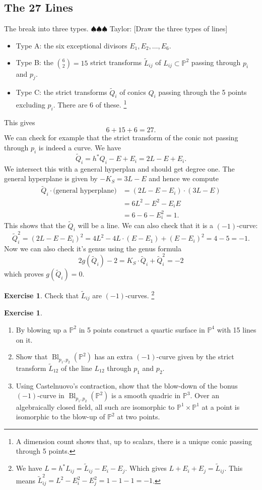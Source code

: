 \documentclass[12pt]{article}
\numberwithin{equation}{section}
\theoremstyle{definition}
\newtheorem{exercise}[theorem]{Exercise}
\theoremstyle{remark}
\newcommand{\PP}{\mathbb{P}}
\newcommand{\Bl}{\operatorname{Bl}}
\newcommand{\taylor}[1]{{\color{blue} \sf $\spadesuit\spadesuit\spadesuit$ Taylor: [#1]}}
\begin{document}
\subsection{The 27 Lines}
The break into three types.  \taylor{Draw the three types of lines}
\begin{itemize}
	\item Type A: the six exceptional divisors $E_1,E_2,\ldots,E_6$.
	\item Type B: the ${6 \choose 2}=15$ strict transforms $\widetilde{L}_{ij}$ of $L_{ij} \subset \PP^2$ passing through $p_i$ and $p_j$.
	\item Type C: the strict transforms $\widetilde{Q}_i$ of conics $Q_i$ passing through the 5 points excluding $p_i$. There are 6 of these. \footnote{A dimension count shows that, up to scalars, there is a unique conic passing through 5 points.}
\end{itemize}

This gives 
$$ 6 + 15 + 6 = 27.$$
We can check for example that the strict transform of the conic not passing through $p_i$ is indeed a curve. 
We have 
$$ \widetilde{Q}_i = h^*Q_i - E + E_i = 2L-E+E_i. $$
We intersect this with a general hyperplan and should get degree one. 
The general hyperplane is given by $ -K_S=3L - E$
and hence we compute 
\begin{align*}
\widetilde{Q}_i \cdot \mbox{(general hyperplane)} &= (2L-E-E_i)\cdot (3L-E) \\
&=6L^2-E^2-E_iE\\
&=6-6-E_i^2=1.
\end{align*}
This shows that the $\widetilde{Q}_i$ will be a line. 
We can also check that it is a $(-1)$-curve:
$$\widetilde{Q}_i^2 = (2L-E-E_i)^2 = 4L^2-4L\cdot (E-E_1) + (E-E_i)^2=4-5=-1.$$
Now we can also check it's genus using the genus formula
$$ 2g(\widetilde{Q}_i) -2 = K_S\cdot \widetilde{Q}_i +\widetilde{Q}_i^2 = -2$$
which proves $g(\widetilde{Q}_i)=0$.

\begin{exercise}
	Check that $\widetilde{L}_{ij}$ are $(-1)$-curves.
	\footnote{We have $L=h^*L_{ij} = \widetilde{L}_{ij}-E_i-E_j$.
		Which gives $L+E_i+E_j = \widetilde{L}_{ij}$. 
		This means $\widetilde{L}_{ij}^2 = L^2 -E_i^2-E_j^2=1-1-1=-1$. }
\end{exercise}

\begin{exercise}
	\begin{enumerate}
		\item By blowing up a $\PP^2$ in 5 points construct a quartic surface in $\PP^4$ with 15 lines on it.
		\item Show that $\Bl_{p_1,p_2}(\PP^2)$ has an extra $(-1)$-curve given by the strict transform $\widetilde{L}_{12}$ of the line $L_{12}$ through $p_1$ and $p_2$. 
		\item Using Castelnuovo's contraction, show that the blow-down of the bonus $(-1)$-curve in $\Bl_{p_1,p_2}(\PP^2)$ is a smooth quadric in $\PP^3$. 
		Over an algebraically closed field, all such are isomorphic to $\PP^1\times \PP^1$ at a point is isomorphic to the blow-up of $\PP^2$ at two points. 
	\end{enumerate}
\end{exercise}
\end{document}
